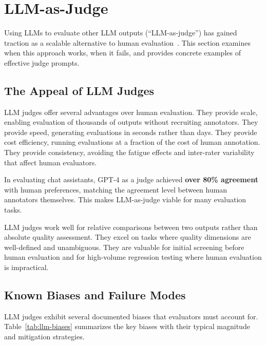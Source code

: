 
\section{LLM-as-Judge}
\label{sec:llm-judges}

Using LLMs to evaluate other LLM outputs (``LLM-as-judge'') has gained traction as a scalable alternative to human evaluation~\citep{zheng2023judging}. This section examines when this approach works, when it fails, and provides concrete examples of effective judge prompts.

\subsection{The Appeal of LLM Judges}

LLM judges offer several advantages over human evaluation. They provide scale, enabling evaluation of thousands of outputs without recruiting annotators. They provide speed, generating evaluations in seconds rather than days. They provide cost efficiency, running evaluations at a fraction of the cost of human annotation. They provide consistency, avoiding the fatigue effects and inter-rater variability that affect human evaluators.

\begin{empirical}
In evaluating chat assistants, GPT-4 as a judge achieved \textbf{over 80\% agreement} with human preferences, matching the agreement level between human annotators themselves. This makes LLM-as-judge viable for many evaluation tasks.
\end{empirical}

LLM judges work well for relative comparisons between two outputs rather than absolute quality assessment. They excel on tasks where quality dimensions are well-defined and unambiguous. They are valuable for initial screening before human evaluation and for high-volume regression testing where human evaluation is impractical.

\subsection{Known Biases and Failure Modes}

LLM judges exhibit several documented biases that evaluators must account for. Table~\ref{tab:llm-biases} summarizes the key biases with their typical magnitude and mitigation strategies.

